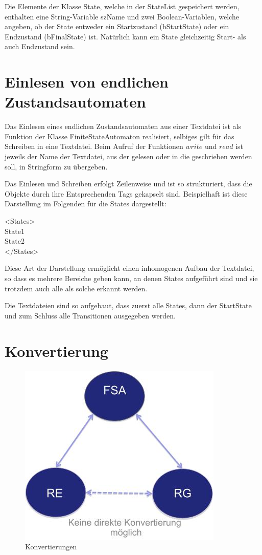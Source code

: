 Die Elemente der Klasse State, welche in der StateList gespeichert werden, enthalten eine String-Variable szName und zwei Boolean-Variablen, welche angeben, ob der State entweder ein Startzustand (bStartState) oder ein Endzustand (bFinalState) ist. Nat\"urlich kann ein State gleichzeitig Start- als auch Endzustand sein.

\section{Einlesen von endlichen Zustandsautomaten}

Das Einlesen eines endlichen Zustandsautomaten aus einer Textdatei ist als Funktion der Klasse FiniteStateAutomaton realisiert, selbiges gilt f\"ur das Schreiben in eine Textdatei. Beim Aufruf der Funktionen $write$ und $read$ ist jeweils der Name der Textdatei, aus der gelesen oder in die geschrieben werden soll, in Stringform zu \"ubergeben.

Das Einlesen und Schreiben erfolgt Zeilenweise und ist so strukturiert, dass die Objekte durch ihre Entsprechenden Tags gekapselt sind. Beispielhaft ist diese Darstellung im Folgenden f\"ur die States dargestellt:

<States> \\
State1 \\
State2 \\
</States>

Diese Art der Darstellung erm\"oglicht einen inhomogenen Aufbau der Textdatei, so dass es mehrere Bereiche geben kann, an denen States aufgef\"uhrt sind und sie trotzdem auch alle als solche erkannt werden.

Die Textdateien sind so aufgebaut, dass zuerst alle States, dann der StartState und zum Schluss alle Transitionen ausgegeben werden.

\section{Konvertierung}

\begin{figure}[h]
 \centering
 \includegraphics[keepaspectratio, scale=0.89]{objectsToInclude/Konvertierung.jpg}
 \caption{Konvertierungen}
\label{fig:FSA_Konv}
\end{figure}

